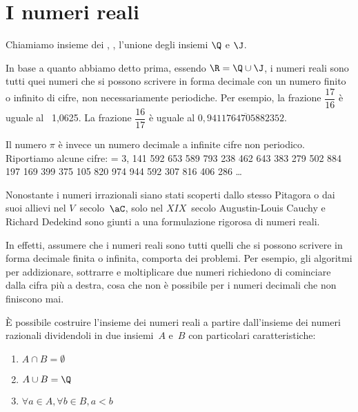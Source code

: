 \section{I numeri reali}

Chiamiamo insieme dei , \indt{\(\R\)}, l'unione degli 
insiemi \(\Q\) e \(\J\). 

In base a quanto abbiamo detto prima, essendo \(\R=\Q \cup \J\), i 
numeri reali sono tutti quei numeri che si possono scrivere in forma 
decimale con un numero finito o infinito di cifre, non necessariamente 
periodiche.
Per esempio, la frazione \(\dfrac{17}{16}\) è uguale al ~1,0625.
La frazione \(\dfrac{16}{17}\) è uguale al  
\(0,\overline{9411764705882352}\).

Il numero \(\pi\) è invece un numero decimale a infinite cifre non periodico. 
Riportiamo alcune cifre:
\indt{\(\pi \)} = 3, 141 592 653 589 793 238 462 643 383 279 502 884 197 169 
399 375 105 820 974 944 592 307 816 406 286
\ldots 

Nonostante i numeri 
irrazionali siano stati scoperti dallo stesso Pitagora o dai suoi allievi 
nel \(V\)~secolo~\(\aC\), solo nel \(XIX\)~secolo Augustin-Louis Cauchy e 
Richard Dedekind sono giunti a una formulazione rigorosa di numeri reali.

In effetti, assumere che i numeri reali sono tutti quelli che si possono 
scrivere in forma decimale finita o infinita,  comporta dei problemi. 
Per esempio, gli algoritmi per addizionare, 
sottrarre e moltiplicare due numeri richiedono di cominciare dalla cifra 
più a destra, cosa che non è possibile per i numeri decimali che non 
finiscono mai. 

È possibile costruire l'insieme dei numeri reali a 
partire dall'insieme dei numeri razionali 
dividendoli in due insiemi~\(A\) 
e~\(B\) 
con particolari caratteristiche:
\begin{enumerate} %
 \item \(A \cap B=\emptyset\)
 \item \(A \cup B=\Q\)
 \item \(\forall a \in A, \forall b \in B, a<b\)
\end{enumerate} %

